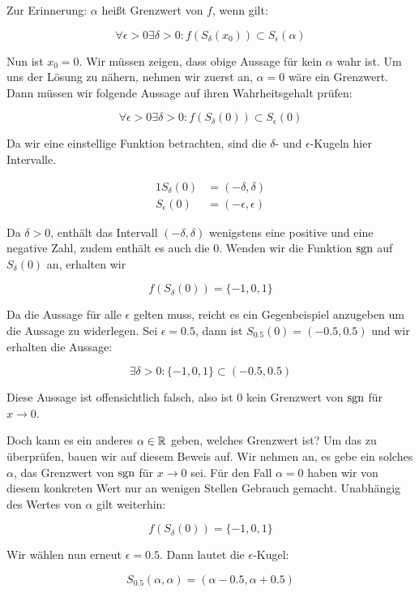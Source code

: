\item Zur Erinnerung: $\alpha$ heißt Grenzwert von $f$, wenn gilt:

$$
\forall \epsilon > 0 \exists \delta > 0 : f(S_\delta(x_0)) \subset S_\epsilon(\alpha)
$$

Nun ist $x_0=0$. Wir müssen zeigen, dass obige Aussage für kein $\alpha$ wahr ist. Um uns der Lösung zu nähern, nehmen wir zuerst an, $\alpha=0$ wäre ein Grenzwert. Dann müssen wir folgende Aussage auf ihren Wahrheitsgehalt prüfen:

$$
\forall \epsilon > 0 \exists \delta > 0 : f(S_\delta(0)) \subset S_\epsilon(0)
$$

Da wir eine einstellige Funktion betrachten, sind die $\delta$- und $\epsilon$-Kugeln hier Intervalle.

\begin{alignat*}{1}
S_\delta(0) &= (-\delta, \delta) \\
S_\epsilon(0) &= (-\epsilon, \epsilon)
\end{alignat*}


Da $\delta > 0$, enthält das Intervall $(-\delta, \delta)$ wenigstens eine positive und eine negative Zahl, zudem enthält es auch die $0$. Wenden wir die Funktion $\text{sgn}$ auf $S_\delta(0)$ an, erhalten wir

$$
	f(S_\delta(0)) = \lbrace -1, 0, 1 \rbrace
$$

Da die Aussage für alle $\epsilon$ gelten muss, reicht es ein Gegenbeispiel anzugeben um die Aussage zu widerlegen. Sei $\epsilon = 0.5$, dann ist $S_{0.5}(0) = (-0.5, 0.5)$ und wir erhalten die Aussage:

$$
\exists \delta > 0 : \lbrace -1, 0, 1 \rbrace  \subset (-0.5, 0.5)
$$

Diese Aussage ist offensichtlich falsch, also ist $0$ kein Grenzwert von $\text{sgn}$ für $x \to 0$.

Doch kann es ein anderes $\alpha\in\mathbb{R}$ geben, welches Grenzwert ist? Um das zu überprüfen, bauen wir auf diesem Beweis auf. Wir nehmen an, es gebe ein solches $\alpha$, das Grenzwert von $\text{sgn}$ für $x \to 0$ sei. Für den Fall $\alpha=0$ haben wir von diesem konkreten Wert nur an wenigen Stellen Gebrauch gemacht. Unabhängig des Wertes von $\alpha$ gilt weiterhin:

$$
f(S_\delta(0)) = \lbrace -1, 0, 1 \rbrace
$$

Wir wählen nun erneut $\epsilon = 0.5$. Dann lautet die $\epsilon$-Kugel:

$$
	S_{0.5}(\alpha, \alpha) = ( \alpha - 0.5, \alpha + 0.5 )
$$

